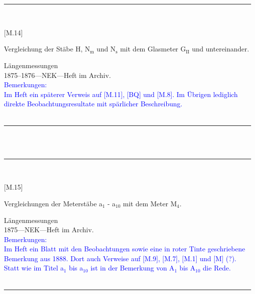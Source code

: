 \\
\vspace*{-2.5pt}\\
\parbox{\textwidth}{%
\rule{\textwidth}{1pt}\vspace*{-3mm}\\
\begin{minipage}[t]{0.22\textwidth}\vspace{0pt}
\Huge\rule[-4mm]{0cm}{1cm}[M.14]
\end{minipage}
\hfill
\begin{minipage}[t]{0.78\textwidth}\vspace{0pt}
\large Vergleichung der Stäbe H, N$_\mathrm{m}$ und N$_\mathrm{s}$ mit dem Glasmeter G$_\mathrm{II}$ und untereinander.\rule[-2mm]{0mm}{2mm}
\end{minipage}
{\footnotesize\flushright
Längenmessungen\\
}
1875--1876\quad---\quad NEK\quad---\quad Heft im Archiv.\\
\textcolor{blue}{Bemerkungen:\\{}
Im Heft ein späterer Verweis auf [M.11], [BQ] und [M.8]. Im Übrigen lediglich direkte Beobachtungsresultate mit spärlicher Beschreibung.\\{}
}
\\[-15pt]
\rule{\textwidth}{1pt}
}
\\
\vspace*{-2.5pt}\\
\parbox{\textwidth}{%
\rule{\textwidth}{1pt}\vspace*{-3mm}\\
\begin{minipage}[t]{0.22\textwidth}\vspace{0pt}
\Huge\rule[-4mm]{0cm}{1cm}[M.15]
\end{minipage}
\hfill
\begin{minipage}[t]{0.78\textwidth}\vspace{0pt}
\large Vergleichungen der Meterstäbe a$_\mathrm{1}$ - a$_\mathrm{10}$ mit dem Meter M$_\mathrm{4}$.\rule[-2mm]{0mm}{2mm}
\end{minipage}
{\footnotesize\flushright
Längenmessungen\\
}
1875\quad---\quad NEK\quad---\quad Heft im Archiv.\\
\textcolor{blue}{Bemerkungen:\\{}
Im Heft ein Blatt mit den Beobachtungen sowie eine in roter Tinte geschriebene Bemerkung aus 1888. Dort auch Verweise auf [M.9], [M.7], [M.1] und [M] (?).\\{}
Statt wie im Titel a$_\mathrm{1}$ bis a$_\mathrm{10}$ ist in der Bemerkung von A$_\mathrm{1}$ bis A$_\mathrm{10}$ die Rede.\\{}
}
\\[-15pt]
\rule{\textwidth}{1pt}
}
